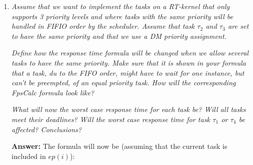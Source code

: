 \documentclass[a4paper,10pt]{article}
\newcommand{\answer}{\textbf{Answer: }}
\begin{document}
\begin{enumerate}
\begin{lstlisting}
              Priovar[A] = 2;
              Priovar[B] = 1;
              Priovar[C] = 3;
              Priovar[D] = 4;
              
              CompTime[A] = 2;
              CompTime[B] = 3;
              CompTime[C] = 5;
              CompTime[D] = 4;
            }
            
            ! Formula(s) to be iterated
            
            formulas {
              RespTime[i] = CompTime[i] +
              sigma(hp, ceiling(RespTime[i] / Period[j]) * CompTime[j]);
            }
          }				   
          
          ! End of definition file
        \end{listlisting}

	
	Another order is $\tau_1$, $\tau_3$, $\tau_2$, $\tau_4$, which will lead to $\tau_2$ not meeting its deadline. The response times are
	
	$R_1 = 2 (< 6)$, $R_2 = 10 (> 7)$, $R_3 = 7 (< 13)$ and $R_4 = 54 (< 60)$.
	The FpsCalc definition file used to calculate this is the same as the previous, except that the priorities have been exchanged as follows:

        \begin{lstlisting}
          Priovar[A] = 1;
          Priovar[B] = 3;
          Priovar[C] = 2;
          Priovar[D] = 4;
        \end{lstlisting}
	
	\item \emph{Assume that we want to implement the tasks on a RT-kernel that only supports 3 priority levels and where tasks with the same priority will be handled in FIFIO order by the scheduler. Assume that task $\tau_2$ and $\tau_3$ are set to have the same priority and that we use a DM priority assignment.}
	
	\emph{Define how the response time formula will be changed when we allow several tasks to have the same priority. Make sure that it is shown in your formula that a task, du to the FIFO order, might have to wait for one instance, but can't be preempted, of an equal priority task. How will the corresponding FpsCalc formula look like?}
	
	\emph{What will now the worst case response time for each task be? Will all tasks meet their deadlines? Will the worst case response time for task $\tau_1$ or $\tau_4$ be affected? Conclusions?}
	
	\answer The formula will now be (assuming that the current task is included in $ep(i)$):
	

\end{enumerate}
\end{document}
